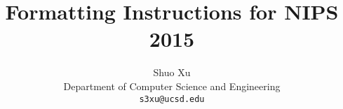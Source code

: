 \documentclass{article} %
\title{Formatting Instructions for NIPS 2015}
\author{
Shuo Xu \\
Department of Computer Science and Engineering \\
\texttt{s3xu@ucsd.edu} \\
}
\begin{document}
\maketitle

\begin{abstract}

\end{abstract}
\end{document}
